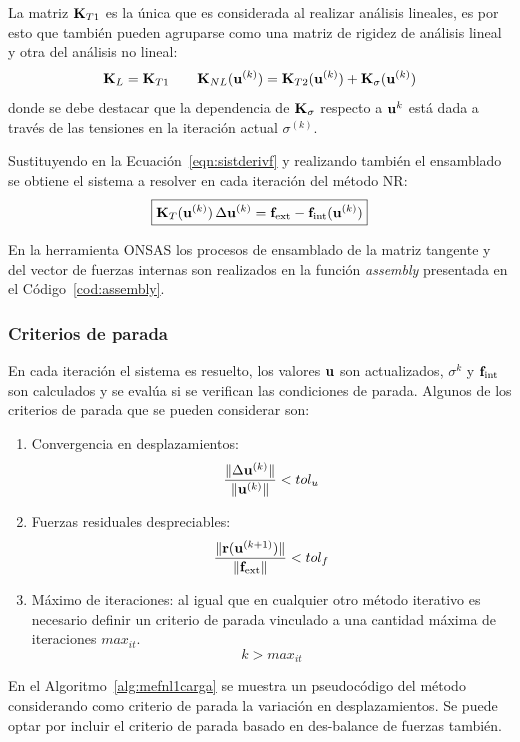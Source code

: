La matriz ${\bf K}_{T1}$ es la única que es considerada al realizar análisis lineales, es por esto que también pueden agruparse como una matriz de rigidez de análisis lineal y otra del análisis no lineal:
\begin{equation}
{\bf K}_L = {\bf K}_{T1} \qquad {\bf K}_{NL} ({\bf u}^{(k)}) = {\bf K}_{T2}({\bf u}^{(k)}) + {\bf K}_{\sigma}({\bf u}^{(k)})
\end{equation}
%
donde se debe destacar que la dependencia de ${\bf K}_{\sigma}$ respecto a ${\bf u}^k$ está dada a través de las tensiones en la iteración actual $\sigma^{(k)}$.

Sustituyendo en la Ecuación~\eqref{eqn:sistderivf} y realizando también el ensamblado se obtiene el sistema a resolver en cada iteración del método NR:
%
\begin{equation}
\boxed{
	{\bf K}_{T} ({\bf u}^{(k)}) \, \Delta {\bf u}^{(k)} = {\bf f}_{\text{ext}} - {\bf f}_{\text{int}}({\bf u}^{(k)})
}
\end{equation}

En la herramienta ONSAS los procesos de ensamblado de la matriz tangente y del vector de fuerzas internas son realizados en la función \textit{assembly} presentada en el Código~\ref{cod:assembly}.

\subsubsection{Criterios de parada}
En cada iteración el sistema es resuelto, los valores ${\bf u}$ son actualizados, $\sigma^k$ y ${\bf f}_{\text{int}}$ son calculados y se evalúa si se verifican las condiciones de parada. %
%
Algunos de los criterios de parada que se pueden considerar son:
%
\begin{enumerate}
	\item Convergencia en desplazamientos:
	$$ \dfrac{ \|\Delta {\bf u}^{(k)} \|}{\| {\bf u}^{(k)} \|} < tol_u $$
	\item Fuerzas residuales despreciables:
	$$ \dfrac{\|{\bf r} ( {\bf u}^{(k+1)} ) \|}{\| {\bf f}_{\text{ext}} \|} < tol_f $$
	\item Máximo de iteraciones: al igual que en cualquier otro método iterativo es necesario definir un criterio de parada vinculado a una cantidad máxima de iteraciones $max_{it}$.
	$$k > max_{it}$$
\end{enumerate}


En el Algoritmo~\ref{alg:mefnl1carga} se muestra un pseudocódigo del método considerando como criterio de parada la variación en desplazamientos. %
%
Se puede optar por incluir el criterio de parada basado en des-balance de fuerzas también.

